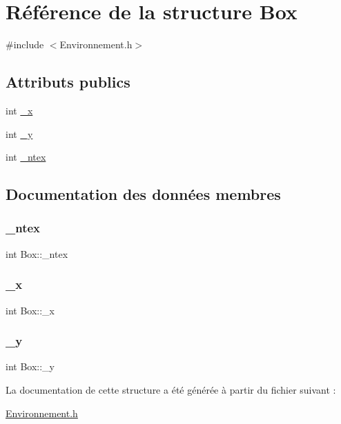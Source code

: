 \hypertarget{structBox}{}\section{Référence de la structure Box}
\label{structBox}


{\ttfamily \#include $<$Environnement.\+h$>$}

\subsection*{Attributs publics}
\begin{DoxyCompactItemize}
\item 
int \hyperlink{structBox_afbde3ca4e6726ca731fc4e9bd72a7593}{\+\_\+x}
\item 
int \hyperlink{structBox_ab94a931f8a78f844d8adca478de32f3a}{\+\_\+y}
\item 
int \hyperlink{structBox_abf38f67df77d8a8e07d5f5e15120bf78}{\+\_\+ntex}
\end{DoxyCompactItemize}


\subsection{Documentation des données membres}
\mbox{\label{structBox_abf38f67df77d8a8e07d5f5e15120bf78}} 
\subsubsection{\texorpdfstring{\+\_\+ntex}{\_ntex}}
{\footnotesize\ttfamily int Box\+::\+\_\+ntex}

\mbox{\label{structBox_afbde3ca4e6726ca731fc4e9bd72a7593}} 
\subsubsection{\texorpdfstring{\+\_\+x}{\_x}}
{\footnotesize\ttfamily int Box\+::\+\_\+x}

\mbox{\label{structBox_ab94a931f8a78f844d8adca478de32f3a}} 
\subsubsection{\texorpdfstring{\+\_\+y}{\_y}}
{\footnotesize\ttfamily int Box\+::\+\_\+y}



La documentation de cette structure a été générée à partir du fichier suivant \+:\begin{DoxyCompactItemize}
\item 
\hyperlink{Environnement_8h}{Environnement.\+h}\end{DoxyCompactItemize}
